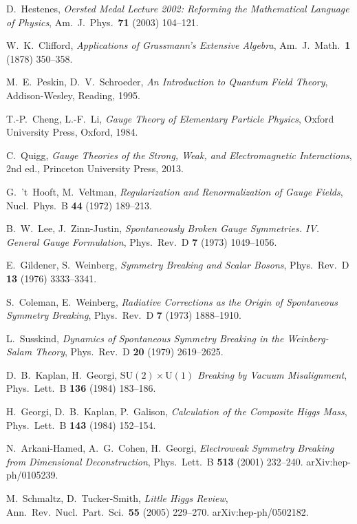 \documentclass[11pt,a4paper]{article}
\newcommand{\SU}{\mathrm{SU}}
\newcommand{\UU}{\mathrm{U}}
\theoremstyle{definition}
\theoremstyle{plain}
\theoremstyle{remark}
\begin{document}
\begin{thebibliography}{99}
D.~Hestenes, \emph{Oersted Medal Lecture 2002: Reforming the Mathematical Language of Physics}, Am.\ J.\ Phys.\ \textbf{71} (2003) 104--121.

W.~K.~Clifford, \emph{Applications of Grassmann's Extensive Algebra}, Am.\ J.\ Math.\ \textbf{1} (1878) 350--358.

M.~E.~Peskin, D.~V.~Schroeder, \emph{An Introduction to Quantum Field Theory}, Addison-Wesley, Reading, 1995.

T.-P.~Cheng, L.-F.~Li, \emph{Gauge Theory of Elementary Particle Physics}, Oxford University Press, Oxford, 1984.

C.~Quigg, \emph{Gauge Theories of the Strong, Weak, and Electromagnetic Interactions}, 2nd ed., Princeton University Press, 2013.

G.~'t~Hooft, M.~Veltman, \emph{Regularization and Renormalization of Gauge Fields}, Nucl.\ Phys.\ B \textbf{44} (1972) 189--213.

B.~W.~Lee, J.~Zinn-Justin, \emph{Spontaneously Broken Gauge Symmetries. IV. General Gauge Formulation}, Phys.\ Rev.\ D \textbf{7} (1973) 1049--1056.

E.~Gildener, S.~Weinberg, \emph{Symmetry Breaking and Scalar Bosons}, Phys.\ Rev.\ D \textbf{13} (1976) 3333--3341.

S.~Coleman, E.~Weinberg, \emph{Radiative Corrections as the Origin of Spontaneous Symmetry Breaking}, Phys.\ Rev.\ D \textbf{7} (1973) 1888--1910.

L.~Susskind, \emph{Dynamics of Spontaneous Symmetry Breaking in the Weinberg-Salam Theory}, Phys.\ Rev.\ D \textbf{20} (1979) 2619--2625.

D.~B.~Kaplan, H.~Georgi, \emph{$\SU(2) \times \UU(1)$ Breaking by Vacuum Misalignment}, Phys.\ Lett.\ B \textbf{136} (1984) 183--186.

H.~Georgi, D.~B.~Kaplan, P.~Galison, \emph{Calculation of the Composite Higgs Mass}, Phys.\ Lett.\ B \textbf{143} (1984) 152--154.

N.~Arkani-Hamed, A.~G.~Cohen, H.~Georgi, \emph{Electroweak Symmetry Breaking from Dimensional Deconstruction}, Phys.\ Lett.\ B \textbf{513} (2001) 232--240. arXiv:hep-ph/0105239.

M.~Schmaltz, D.~Tucker-Smith, \emph{Little Higgs Review}, Ann.\ Rev.\ Nucl.\ Part.\ Sci.\ \textbf{55} (2005) 229--270. arXiv:hep-ph/0502182.


\end{thebibliography}
\end{document}
